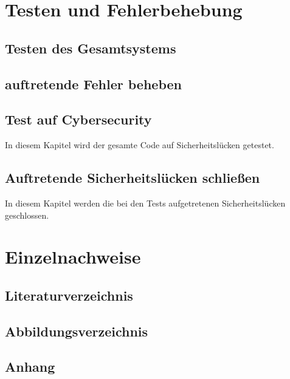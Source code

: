 \documentclass[]{article}
\begin{document}
\section{Testen und Fehlerbehebung}
\subsection{Testen des Gesamtsystems}
\subsection{auftretende Fehler beheben}
\subsection{Test auf Cybersecurity}
In diesem Kapitel wird der gesamte Code auf Sicherheitslücken getestet.
\subsection{Auftretende Sicherheitslücken schließen}
In diesem Kapitel werden die bei den Tests aufgetretenen Sicherheitslücken geschlossen.

\section{Einzelnachweise}
\subsection{Literaturverzeichnis}
\subsection{Abbildungsverzeichnis}
\subsection{Anhang}
\end{document}
